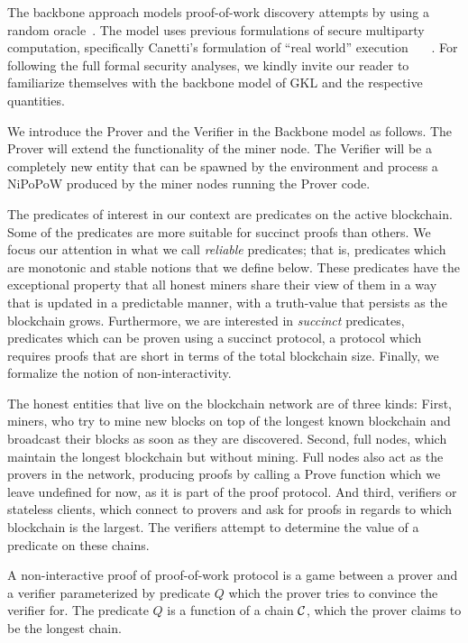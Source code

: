 The backbone approach models proof-of-work discovery attempts by using a random
oracle~\cite{RO}. The model uses previous formulations of secure multiparty
computation, specifically Canetti's formulation of ``real world'' execution
~\cite{uc0}~\cite{uc1}~\cite{uc2}. For following the full formal security
analyses, we kindly invite our reader to familiarize themselves with the
backbone model of GKL\cite{backbone} and the respective quantities.

We introduce the Prover and the Verifier in
the Backbone model as follows. The Prover will extend the functionality
of the miner node. The Verifier will be a completely new entity that can be spawned
by the environment and process a NiPoPoW produced by the miner nodes running
the Prover code.


The predicates of interest in our context are predicates on the active
blockchain. Some of the predicates are more suitable for succinct proofs than
others. We focus our attention in what we call \textit{reliable} predicates;
that is, predicates which are monotonic and stable notions that we define below.
These predicates have the exceptional property that all honest miners share
their view of them in a way that is updated in a predictable manner, with a
truth-value that persists as the blockchain grows.  Furthermore, we are
interested in \textit{succinct} predicates, predicates which can be proven using
a succinct protocol, a protocol which requires proofs that are short in terms of
the total blockchain size. Finally, we formalize the notion of non-interactivity.

The honest entities that live on the blockchain network are of three kinds:
First, miners, who try to mine new blocks on top of the longest known blockchain
and broadcast their blocks as soon as they are discovered. Second, full nodes,
which maintain the longest blockchain but without mining. Full nodes also act as
the provers in the network, producing proofs by calling a Prove function which
we leave undefined for now, as it is part of the proof protocol. And third,
verifiers or stateless clients, which connect to provers and ask for proofs in
regards to which blockchain is the largest. The verifiers attempt to determine the value of a predicate on these chains.

A non-interactive proof of proof-of-work protocol is a game between a prover
and a verifier parameterized by predicate $Q$ which the prover tries to
convince the verifier for. The predicate $Q$ is a function of a chain $\mathcal{C}$,
which the prover claims to be the longest chain.

